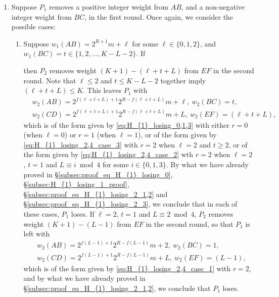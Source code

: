 \documentclass[11pt,reqno]{amsart}
\theoremstyle{definition}
\theoremstyle{definition}
\begin{document}
\begin{enumerate}
\item Suppose $P_{1}$ removes a positive integer weight from $AB$, and a non-negative integer weight from $BC$, in the first round. Once again, we consider the possible cases:
\begin{enumerate}
\item Suppose $w_{1}(AB)=2^{R+1}m+\ell$ for some $\ell \in \{0,1,2\}$, and $w_{1}(BC)=t \in\{1,2,\ldots,K-L-2\}$. If 
then $P_{2}$ removes weight $(K+1)-(\ell+t+L)$ from $EF$ in the second round. Note that $\ell \leqslant 2$ and $t \leqslant K-L-2$ together imply $(\ell+t+L) \leqslant K$. This leaves $P_{1}$ with
\begin{align}
{}&w_{2}(AB)=2^{f(\ell+t+L)+1}2^{R-f(\ell+t+L)}m+\ell,\ w_{2}(BC)=t,\nonumber\\
{}&w_{2}(CD)=2^{f(\ell+t+L)+1}2^{R-f(\ell+t+L)}m+L,\ w_{2}(EF)=(\ell+t+L),\nonumber
\end{align} 
which is of the form given by \eqref{eq:H_{1}_losing_0,1,3} with either $r=0$ (when $\ell=0$) or $r=1$ (when $\ell=1$), or of the form given by \eqref{eq:H_{1}_losing_2,4_case_3} with $r=2$ when $\ell=2$ and $t \geqslant 2$, or of the form given by \eqref{eq:H_{1}_losing_2,4_case_2} wth $r=2$ when $\ell=2$, $t=1$ and $L \equiv i \bmod 4$ for some $i \in \{0,1,3\}$. By what we have already proved in \S\ref{subsec:proof_eq_H_{1}_losing_0}, \S\ref{subsec:H_{1}_losing_1_proof}, \S\ref{subsec:proof_eq_H_{1}_losing_2_1,2} and \S\ref{subsec:proof_eq_H_{1}_losing_2_3}, we conclude that in each of these cases, $P_{1}$ loses. If $\ell=2$, $t=1$ and $L \equiv 2 \bmod 4$, $P_{2}$ removes weight $(K+1)-(L-1)$ from $EF$ in the second round, so that $P_{1}$ is left with
\begin{align}
{}&w_{2}(AB)=2^{f(L-1)+1}2^{R-f(L-1)}m+2,\ w_{2}(BC)=1,\nonumber\\
{}&w_{2}(CD)=2^{f(L-1)+1}2^{R-f(L-1)}m+L,\ w_{2}(EF)=(L-1),\nonumber
\end{align}
which is of the form given by \eqref{eq:H_{1}_losing_2,4_case_1} with $r=2$, and by what we have already proved in \S\ref{subsec:proof_eq_H_{1}_losing_2_1,2}, we conclude that $P_{1}$ loses.


\end{enumerate}
\end{enumerate}
\end{document}
